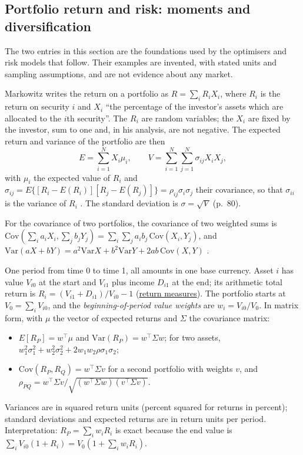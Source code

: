 \subsection{Portfolio return and risk: moments and diversification}

The two entries in this section are the foundations used by the optimisers and risk models that follow. Their examples are invented, with stated units and sampling assumptions, and are not evidence about any market.

\begin{qfmethod}\label{meth:portfolio-return-moments}
 Markowitz writes the return on a portfolio as $R=\sum_iR_iX_i$, where $R_i$ is the return on security $i$ and $X_i$ ``the percentage of the investor's assets which are allocated to the $i$th security''. The $R_i$ are random variables; the $X_i$ are fixed by the investor, sum to one and, in his analysis, are not negative. The expected return and variance of the portfolio are then
\[ E=\sum_{i=1}^NX_i\mu_i,\qquad V=\sum_{i=1}^N\sum_{j=1}^N\sigma_{ij}X_iX_j, \]
with $\mu_i$ the expected value of $R_i$ and $\sigma_{ij}=E\{[R_i-E(R_i)][R_j-E(R_j)]\}=\rho_{ij}\sigma_i\sigma_j$ their covariance, so that $\sigma_{ii}$ is the variance of $R_i$ \citep[\emph{Journal of Finance} 7(1), 1952, pp.~80--81]{s6-markowitz}. The standard deviation is $\sigma=\sqrt V$ (p.~80).

For the covariance of two portfolios, the covariance of two weighted sums is $\mathrm{Cov}(\sum_ia_iX_i,\sum_jb_jY_j)=\sum_i\sum_ja_ib_j\,\mathrm{Cov}(X_i,Y_j)$, and $\mathrm{Var}(aX+bY)=a^2\mathrm{Var}X+b^2\mathrm{Var}Y+2ab\,\mathrm{Cov}(X,Y)$ \citep[sec.~5.3.1, Lemma~5.3 and eq.~(5.21)]{probability-statistics-random-processes}.

 One period from time 0 to time 1, all amounts in one base currency. Asset $i$ has value $V_{i0}$ at the start and $V_{i1}$ plus income $D_{i1}$ at the end; its arithmetic total return is $R_i=(V_{i1}+D_{i1})/V_{i0}-1$ (\hyperref[def:return-measures]{return measures}). The portfolio starts at $V_0=\sum_iV_{i0}$, and the \emph{beginning-of-period value weights} are $w_i=V_{i0}/V_0$. In matrix form, with $\mu$ the vector of expected returns and $\Sigma$ the covariance matrix:
\begin{itemize}
\item $E[R_P]=w^\top\mu$ and $\mathrm{Var}(R_P)=w^\top\Sigma w$; for two assets, $w_1^2\sigma_1^2+w_2^2\sigma_2^2+2w_1w_2\rho\sigma_1\sigma_2$;
\item $\mathrm{Cov}(R_P,R_Q)=w^\top\Sigma v$ for a second portfolio with weights $v$, and $\rho_{PQ}=w^\top\Sigma v/\sqrt{(w^\top\Sigma w)(v^\top\Sigma v)}$.
\end{itemize}
Variances are in squared return units (percent squared for returns in percent); standard deviations and expected returns are in return units per period. Interpretation: $R_P=\sum_iw_iR_i$ is exact because the end value is $\sum_iV_{i0}(1+R_i)=V_0(1+\sum_iw_iR_i)$.


\end{qfmethod}
